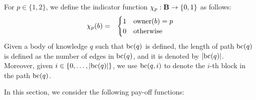 \documentclass{article}
\begin{document}
For $p \in \{1,2\}$, we define the indicator  function $\chi_p : \mathbf{B} \to \{0,1\}$ as follows:
\begin{eqnarray*}
\chi_p(b) & = & 
\begin{cases}
1 & \text{owner}(b) = p\\
0 & \text{otherwise}
\end{cases}
\end{eqnarray*}
Given a body of knowledge $q$ such that $\text{bc}(q)$ is defined, the length of path $\text{bc}(q)$ is defined as the number of edges in $\text{bc}(q)$, and it is denoted by $|\text{bc}(q)|$. Moreover, given $i \in \{0, \ldots, |\text{bc}(q)|\}$, we use $\text{bc}(q,i)$ to denote the $i$-th block in the path $\text{bc}(q)$.

In this section, we consider the following pay-off functions:
\end{document}
